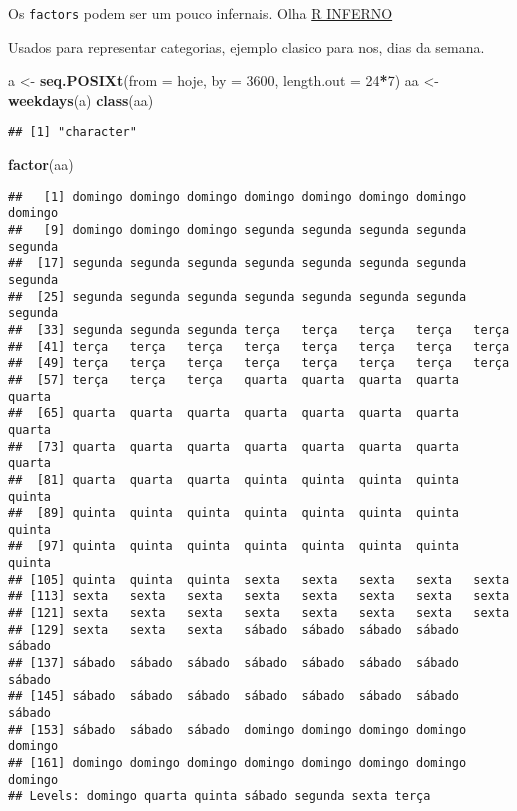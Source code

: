 \documentclass[]{book}
\newenvironment{Shaded}{\begin{snugshade}}{\end{snugshade}}
\newcommand{\KeywordTok}[1]{\textcolor[rgb]{0.13,0.29,0.53}{\textbf{#1}}}
\newcommand{\DataTypeTok}[1]{\textcolor[rgb]{0.13,0.29,0.53}{#1}}
\newcommand{\DecValTok}[1]{\textcolor[rgb]{0.00,0.00,0.81}{#1}}
\newcommand{\StringTok}[1]{\textcolor[rgb]{0.31,0.60,0.02}{#1}}
\newcommand{\OperatorTok}[1]{\textcolor[rgb]{0.81,0.36,0.00}{\textbf{#1}}}
\newcommand{\NormalTok}[1]{#1}
\theoremstyle{definition}
\theoremstyle{definition}
\theoremstyle{definition}
\theoremstyle{remark}
\begin{document}
Os \texttt{factors} podem ser um pouco infernais. Olha
\href{http://www.burns-stat.com/documents/books/the-r-inferno/}{R
INFERNO}

Usados para representar categorias, ejemplo clasico para nos, dias da
semana.

\begin{Shaded}
\begin{Highlighting}[]
\NormalTok{a <-}\StringTok{ }\KeywordTok{seq.POSIXt}\NormalTok{(}\DataTypeTok{from =}\NormalTok{ hoje, }\DataTypeTok{by =} \DecValTok{3600}\NormalTok{, }\DataTypeTok{length.out =} \DecValTok{24}\OperatorTok{*}\DecValTok{7}\NormalTok{)}
\NormalTok{aa <-}\StringTok{ }\KeywordTok{weekdays}\NormalTok{(a)}
\KeywordTok{class}\NormalTok{(aa)}
\end{Highlighting}
\end{Shaded}

\begin{verbatim}
## [1] "character"
\end{verbatim}

\begin{Shaded}
\begin{Highlighting}[]
\KeywordTok{factor}\NormalTok{(aa)}
\end{Highlighting}
\end{Shaded}

\begin{verbatim}
##   [1] domingo domingo domingo domingo domingo domingo domingo domingo
##   [9] domingo domingo domingo segunda segunda segunda segunda segunda
##  [17] segunda segunda segunda segunda segunda segunda segunda segunda
##  [25] segunda segunda segunda segunda segunda segunda segunda segunda
##  [33] segunda segunda segunda terça   terça   terça   terça   terça  
##  [41] terça   terça   terça   terça   terça   terça   terça   terça  
##  [49] terça   terça   terça   terça   terça   terça   terça   terça  
##  [57] terça   terça   terça   quarta  quarta  quarta  quarta  quarta 
##  [65] quarta  quarta  quarta  quarta  quarta  quarta  quarta  quarta 
##  [73] quarta  quarta  quarta  quarta  quarta  quarta  quarta  quarta 
##  [81] quarta  quarta  quarta  quinta  quinta  quinta  quinta  quinta 
##  [89] quinta  quinta  quinta  quinta  quinta  quinta  quinta  quinta 
##  [97] quinta  quinta  quinta  quinta  quinta  quinta  quinta  quinta 
## [105] quinta  quinta  quinta  sexta   sexta   sexta   sexta   sexta  
## [113] sexta   sexta   sexta   sexta   sexta   sexta   sexta   sexta  
## [121] sexta   sexta   sexta   sexta   sexta   sexta   sexta   sexta  
## [129] sexta   sexta   sexta   sábado  sábado  sábado  sábado  sábado 
## [137] sábado  sábado  sábado  sábado  sábado  sábado  sábado  sábado 
## [145] sábado  sábado  sábado  sábado  sábado  sábado  sábado  sábado 
## [153] sábado  sábado  sábado  domingo domingo domingo domingo domingo
## [161] domingo domingo domingo domingo domingo domingo domingo domingo
## Levels: domingo quarta quinta sábado segunda sexta terça
\end{verbatim}
\end{document}
